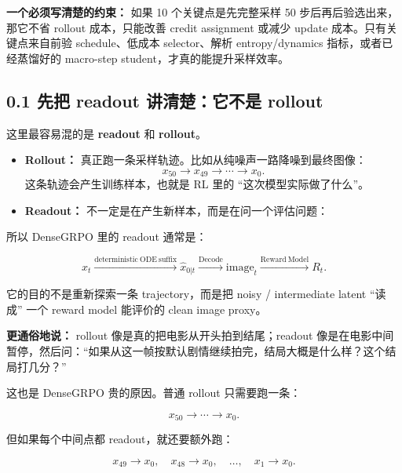 \begin{warnbox}
\textbf{一个必须写清楚的约束：} 如果 10 个关键点是先完整采样 50 步后再后验选出来，那它不省 rollout 成本，只能改善 credit assignment 或减少 update 成本。只有关键点来自前验 schedule、低成本 selector、解析 entropy/dynamics 指标，或者已经蒸馏好的 macro-step student，才真的能提升采样效率。
\end{warnbox}

\subsection{0.1 先把 readout 讲清楚：它不是 rollout}

这里最容易混的是 \textbf{readout} 和 \textbf{rollout}。

\begin{itemize}[leftmargin=1.5em]
  \item \textbf{Rollout：} 真正跑一条采样轨迹。比如从纯噪声一路降噪到最终图像：
  \[
  x_{50}\rightarrow x_{49}\rightarrow\cdots\rightarrow x_0.
  \]
  这条轨迹会产生训练样本，也就是 RL 里的 ``这次模型实际做了什么''。
  \item \textbf{Readout：} 不一定是在产生新样本，而是在问一个评估问题：
\end{itemize}

所以 DenseGRPO 里的 readout 通常是：

\[
x_t
\xrightarrow{\mathrm{deterministic\ ODE\ suffix}}
\hat{x}_{0|t}
\xrightarrow{\mathrm{Decode}}
\mathrm{image}_{t}
\xrightarrow{\mathrm{Reward\ Model}}
R_t.
\]

它的目的不是重新探索一条 trajectory，而是把 noisy / intermediate latent ``读成'' 一个 reward model 能评价的 clean image proxy。

\begin{intubox}
\textbf{更通俗地说：} rollout 像是真的把电影从开头拍到结尾；readout 像是在电影中间暂停，然后问：``如果从这一帧按默认剧情继续拍完，结局大概是什么样？这个结局打几分？''
\end{intubox}

这也是 DenseGRPO 贵的原因。普通 rollout 只需要跑一条：

\[
x_{50}\rightarrow\cdots\rightarrow x_0.
\]

但如果每个中间点都 readout，就还要额外跑：

\[
x_{49}\rightarrow x_0,
\quad
x_{48}\rightarrow x_0,
\quad
\ldots,
\quad
x_1\rightarrow x_0.
\]

